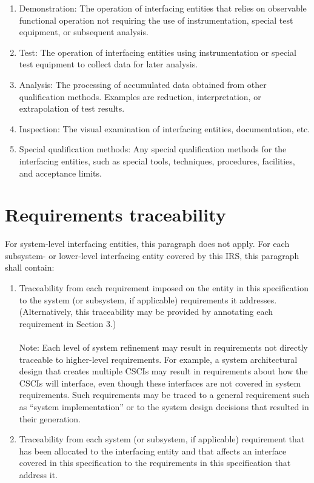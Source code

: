 \begin{enumerate}
\itemsep1pt\parskip0pt
\item
  Demonstration: The operation of interfacing entities that relies on
  observable functional operation not requiring the use of
  instrumentation, special test equipment, or subsequent analysis.
\item
  Test: The operation of interfacing entities using instrumentation or
  special test equipment to collect data for later analysis.
\item
  Analysis: The processing of accumulated data obtained from other
  qualification methods. Examples are reduction, interpretation, or
  extrapolation of test results.
\item
  Inspection: The visual examination of interfacing entities,
  documentation, etc.
\item
  Special qualification methods: Any special qualification methods for
  the interfacing entities, such as special tools, techniques,
  procedures, facilities, and acceptance limits.
\end{enumerate}

\section{Requirements traceability}

For system-level interfacing entities, this paragraph does not apply.
For each subsystem- or lower-level interfacing entity covered by this
IRS, this paragraph shall contain:

\begin{enumerate}
\itemsep1pt\parskip0pt
\item
  Traceability from each requirement imposed on the entity in this
  specification to the system (or subsystem, if applicable) requirements
  it addresses. (Alternatively, this traceability may be provided by
  annotating each requirement in Section 3.) \\\\ Note: Each level of
  system refinement may result in requirements not directly traceable to
  higher-level requirements. For example, a system architectural design
  that creates multiple CSCIs may result in requirements about how the
  CSCIs will interface, even though these interfaces are not covered in
  system requirements. Such requirements may be traced to a general
  requirement such as ``system implementation'' or to the system design
  decisions that resulted in their generation.
\item
  Traceability from each system (or subsystem, if applicable)
  requirement that has been allocated to the interfacing entity and that
  affects an interface covered in this specification to the requirements
  in this specification that address it.
\end{enumerate}

